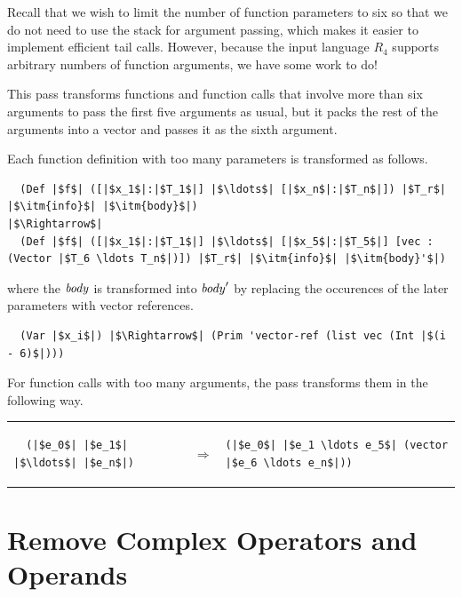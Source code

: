 \documentclass[11pt]{book}
\begin{document}
Recall that we wish to limit the number of function parameters to six
so that we do not need to use the stack for argument passing, which
makes it easier to implement efficient tail calls.  However, because
the input language $R_4$ supports arbitrary numbers of function
arguments, we have some work to do!

This pass transforms functions and function calls that involve more
than six arguments to pass the first five arguments as usual, but it
packs the rest of the arguments into a vector and passes it as the
sixth argument.

Each function definition with too many parameters is transformed as
follows.
\begin{lstlisting}
  (Def |$f$| ([|$x_1$|:|$T_1$|] |$\ldots$| [|$x_n$|:|$T_n$|]) |$T_r$| |$\itm{info}$| |$\itm{body}$|) 
|$\Rightarrow$|
  (Def |$f$| ([|$x_1$|:|$T_1$|] |$\ldots$| [|$x_5$|:|$T_5$|] [vec : (Vector |$T_6 \ldots T_n$|)]) |$T_r$| |$\itm{info}$| |$\itm{body}'$|) 
\end{lstlisting}
where the $\mathit{body}$ is transformed into $\mathit{body}'$ by replacing
the occurences of the later parameters with vector references.
\begin{lstlisting}
  (Var |$x_i$|) |$\Rightarrow$| (Prim 'vector-ref (list vec (Int |$(i - 6)$|)))
\end{lstlisting}

For function calls with too many arguments, the 
pass transforms them in the following way.

\begin{tabular}{lll}
\begin{minipage}{0.2\textwidth}
\begin{lstlisting}
  (|$e_0$| |$e_1$| |$\ldots$| |$e_n$|) 
\end{lstlisting}
\end{minipage}
&
$\Rightarrow$
&
\begin{minipage}{0.4\textwidth}
\begin{lstlisting}
(|$e_0$| |$e_1 \ldots e_5$| (vector |$e_6 \ldots e_n$|))
\end{lstlisting}
\end{minipage}
\end{tabular}


\section{Remove Complex Operators and Operands}
\label{sec:rco-r4}
\end{document}
